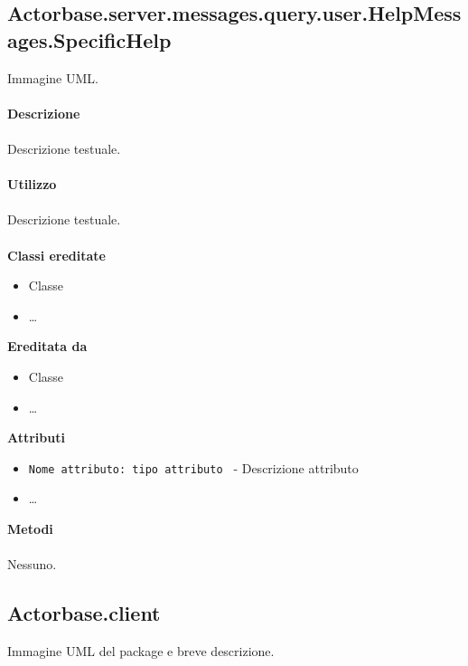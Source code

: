 \documentclass[a4paper]{article}
\begin{document}
	\subsection{Actorbase.server.messages.query.user.HelpMessages.SpecificHelp}
		Immagine UML.
		\\ \\
		\textbf{Descrizione}
			\\ \\
			Descrizione testuale.
			\\ \\
		\textbf{Utilizzo}
			\\ \\
			Descrizione testuale.
			\\ \\
		\textbf{Classi ereditate}
			\begin{itemize}
				\item Classe
				\item \dots
			\end{itemize}
		\textbf{Ereditata da}
			\begin{itemize}
				\item Classe
				\item \dots
			\end{itemize}
		\textbf{Attributi}
			\begin{itemize}
				\item \texttt{Nome attributo: tipo attributo } - Descrizione attributo
				\item \dots
			\end{itemize}
		\textbf{Metodi}
			\\ \\
			Nessuno.	
			
	\subsection{Actorbase.client}
		Immagine UML del package e breve descrizione.
	
\end{document}
